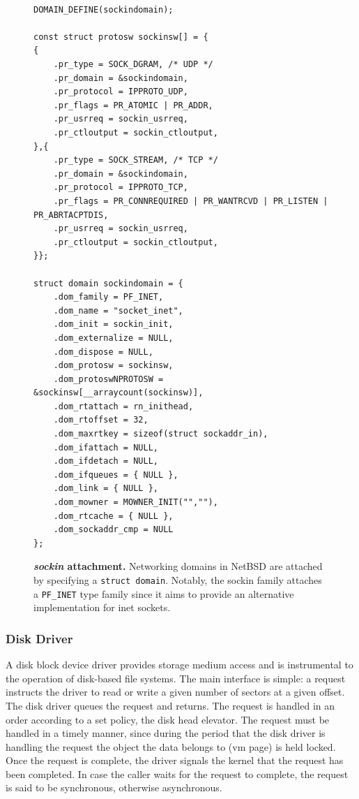 \begin{figure}
{\tt \scriptsize
\begin{verbatim}
DOMAIN_DEFINE(sockindomain);

const struct protosw sockinsw[] = {
{
    .pr_type = SOCK_DGRAM, /* UDP */
    .pr_domain = &sockindomain,
    .pr_protocol = IPPROTO_UDP,
    .pr_flags = PR_ATOMIC | PR_ADDR,
    .pr_usrreq = sockin_usrreq,
    .pr_ctloutput = sockin_ctloutput,
},{
    .pr_type = SOCK_STREAM, /* TCP */
    .pr_domain = &sockindomain,
    .pr_protocol = IPPROTO_TCP,
    .pr_flags = PR_CONNREQUIRED | PR_WANTRCVD | PR_LISTEN | PR_ABRTACPTDIS,
    .pr_usrreq = sockin_usrreq,
    .pr_ctloutput = sockin_ctloutput,
}};

struct domain sockindomain = {
    .dom_family = PF_INET,
    .dom_name = "socket_inet",
    .dom_init = sockin_init,
    .dom_externalize = NULL,
    .dom_dispose = NULL,
    .dom_protosw = sockinsw,
    .dom_protoswNPROTOSW = &sockinsw[__arraycount(sockinsw)],
    .dom_rtattach = rn_inithead,
    .dom_rtoffset = 32,
    .dom_maxrtkey = sizeof(struct sockaddr_in),
    .dom_ifattach = NULL,
    .dom_ifdetach = NULL,
    .dom_ifqueues = { NULL },
    .dom_link = { NULL },
    .dom_mowner = MOWNER_INIT("",""),
    .dom_rtcache = { NULL },
    .dom_sockaddr_cmp = NULL
};
\end{verbatim}}
\caption[sockin attachment]{
\textbf{\textit{sockin} attachment.}
Networking domains in NetBSD are attached by specifying a \texttt{struct
domain}.  Notably, the sockin family attaches a \texttt{PF\_INET}
type family since it aims to provide an alternative implementation for
inet sockets.
}
\label{fig:sockin}
\end{figure}

\subsubsection{Disk Driver}
\label{chap:diskdriver}

A disk block device driver provides storage medium access and is
instrumental to the operation of disk-based file systems.  The main
interface is simple: a request instructs the driver to read or
write a given number of sectors at a given offset.  The disk driver
queues the request and returns.  The request is handled in an order
according to a set policy, \eg the disk head elevator.  The request
must be handled in a timely manner, since during the period that
the disk driver is handling the request the object the data belongs
to (\eg vm page) is held locked.  Once the request is complete,
the driver signals the kernel that the request has been completed.
In case the caller waits for the request to complete, the request
is said to be synchronous, otherwise asynchronous.

